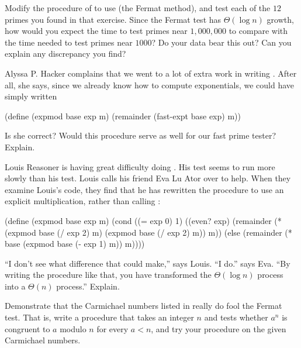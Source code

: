\begin{exercise}
	\label{Exercise 1.24}
	Modify the  procedure of  to use  (the Fermat method), and test each of the \( 12 \) primes you found in that exercise.
	Since the Fermat test has \( Θ(\log n) \) growth, how would you expect the time to test primes near \( 1,000,000 \) to compare with the time needed to test primes near \( 1000 \)?
	Do your data bear this out?
	Can you explain any discrepancy you find?
\end{exercise}



\begin{exercise}
	\label{Exercise 1.25}
	Alyssa P. Hacker complains that we went to a lot of extra work in writing .
	After all, she says, since we already know how to compute exponentials, we could have simply written
	\begin{scheme}
	  (define (expmod base exp m)
	    (remainder (fast-expt base exp) m))
	\end{scheme}
	Is she correct?
	Would this procedure serve as well for our fast prime tester?
	Explain.
\end{exercise}



\begin{exercise}
	\label{Exercise 1.26}
	Louis Reasoner is having great difficulty doing .
	His  test seems to run more slowly than his  test.
	Louis calls his friend Eva Lu Ator over to help.
	When they examine Louis’s code, they find that he has rewritten the  procedure to use an explicit multiplication, rather than calling :
	\begin{scheme}
	  (define (expmod base exp m)
	    (cond ((= exp 0) 1)
	          ((even? exp)
	           (remainder (* (expmod base (/ exp 2) m)
	                         (expmod base (/ exp 2) m))
	                      m))
	          (else
	           (remainder (* base
	                         (expmod base (- exp 1) m))
	                      m))))
	\end{scheme}
	“I don’t see what difference that could make,” says Louis.
	“I do.” says Eva.
	“By writing the procedure like that, you have transformed the \( Θ(\log n) \) process into a \( Θ(n) \) process.”
	Explain.
\end{exercise}



\begin{exercise}
	\label{Exercise 1.27}
	Demonstrate that the Carmichael numbers listed in  really do fool the Fermat test.
	That is, write a procedure that takes an integer \( n \) and tests whether \( a^n \) is congruent to \( a \) modulo \( n \) for every \( a < n \), and try your procedure on the given Carmichael numbers.
\end{exercise}



